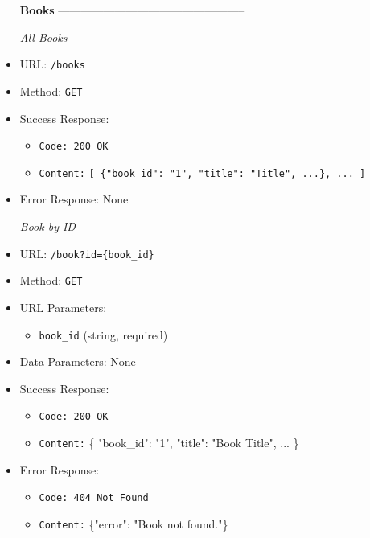 \begin{itemize}
\item[\textbf{Books}] --------------------------------------------------

\item[\textit{All Books}] 
\item URL: \texttt{/books}  
\item Method: \texttt{GET}  
\item Success Response:
\begin{itemize}
  \item \texttt{Code: 200 OK}  
  \item \texttt{Content:} \texttt{[ \{"book\_id": "1", "title": "Title", ...\}, ... ]}
\end{itemize}
\item Error Response: None  

\item[\textit{Book by ID}] 
\item URL: \texttt{/book?id=\{book\_id\}}  
\item Method: \texttt{GET}  
\item URL Parameters:
\begin{itemize}
  \item \texttt{book\_id} (string, required)
\end{itemize}
\item Data Parameters: None  
\item Success Response:
\begin{itemize}
  \item \texttt{Code: 200 OK}  
  \item \texttt{Content:} \{ "book\_id": "1", "title": "Book Title", ... \}
\end{itemize}
\item Error Response:
\begin{itemize}
  \item \texttt{Code: 404 Not Found}  
  \item \texttt{Content:} \{"error": "Book not found."\}
\end{itemize}


\end{itemize}
